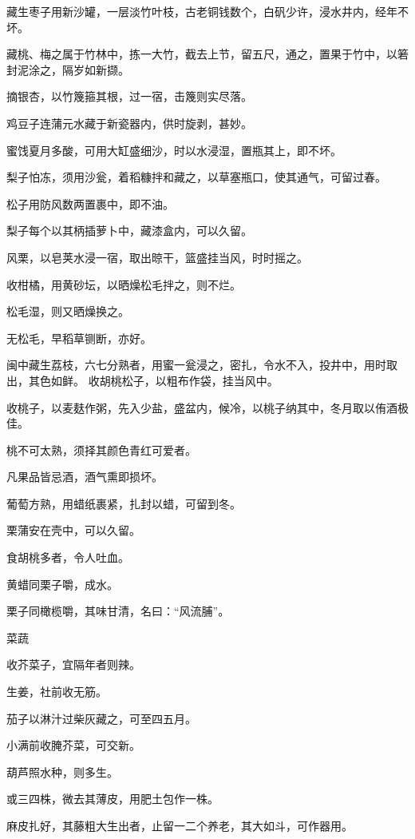 \documentclass[a4paper,12pt,UTF8,twoside]{ctexbook}
\begin{document}
    藏生枣子用新沙罐，一层淡竹叶枝，古老铜钱数个，白矾少许，浸水井内，经年不坏。
    
    藏桃、梅之属于竹林中，拣一大竹，截去上节，留五尺，通之，置果于竹中，以箬封泥涂之，隔岁如新撷。
    
    摘银杏，以竹篾箍其根，过一宿，击篾则实尽落。
    
    鸡豆子连蒲元水藏于新瓷器内，供时旋剥，甚妙。
    
    蜜饯夏月多酸，可用大缸盛细沙，时以水浸湿，置瓶其上，即不坏。
    
    梨子怕冻，须用沙瓮，着稻糠拌和藏之，以草塞瓶口，使其通气，可留过春。
    
    松子用防风数两置裹中，即不油。
    
    梨子每个以其柄插萝卜中，藏漆盒内，可以久留。
    
    风栗，以皂荚水浸一宿，取出晾干，篮盛挂当风，时时摇之。
    
    收柑橘，用黄砂坛，以晒燥松毛拌之，则不烂。
    
    松毛湿，则又晒燥换之。
    
    无松毛，早稻草铡断，亦好。
    
    闽中藏生荔枝，六七分熟者，用蜜一瓮浸之，密扎，令水不入，投井中，用时取出，其色如鲜。 收胡桃松子，以粗布作袋，挂当风中。
    
    收桃子，以麦麸作粥，先入少盐，盛盆内，候冷，以桃子纳其中，冬月取以侑酒极佳。
    
    桃不可太熟，须择其颜色青红可爱者。
    
    凡果品皆忌酒，酒气熏即损坏。
    
    葡萄方熟，用蜡纸裹紧，扎封以蜡，可留到冬。
    
    栗蒲安在壳中，可以久留。
    
    食胡桃多者，令人吐血。
    
    黄蜡同栗子嚼，成水。
    
    栗子同橄榄嚼，其味甘清，名曰：“风流脯”。
    
    菜蔬
    
    收芥菜子，宜隔年者则辣。
    
    生姜，社前收无筋。
    
    茄子以淋汁过柴灰藏之，可至四五月。
    
    小满前收腌芥菜，可交新。
    
    葫芦照水种，则多生。
    
    或三四株，微去其薄皮，用肥土包作一株。
    
    麻皮扎好，其藤粗大生出者，止留一二个养老，其大如斗，可作器用。
    
\end{document}

